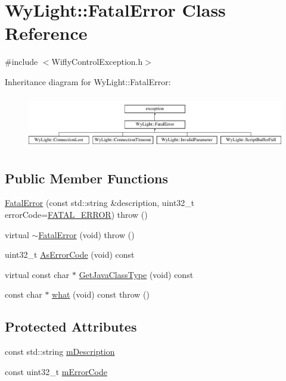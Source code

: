 \hypertarget{class_wy_light_1_1_fatal_error}{\section{Wy\-Light\-:\-:Fatal\-Error Class Reference}
\label{class_wy_light_1_1_fatal_error}
}


{\ttfamily \#include $<$Wifly\-Control\-Exception.\-h$>$}

Inheritance diagram for Wy\-Light\-:\-:Fatal\-Error\-:\begin{figure}[H]
\begin{center}
\leavevmode
\includegraphics[height=2.359551cm]{class_wy_light_1_1_fatal_error}
\end{center}
\end{figure}
\subsection*{Public Member Functions}
\begin{DoxyCompactItemize}
\item 
\hyperlink{class_wy_light_1_1_fatal_error_ab9aa2dc0e064e47d56052e0e9084200f}{Fatal\-Error} (const std\-::string \&description, uint32\-\_\-t error\-Code=\hyperlink{namespace_wy_light_afd625f917b07e9c48f67c4383af5773fab15784bfc61f7544f4b3bbac1817a793}{F\-A\-T\-A\-L\-\_\-\-E\-R\-R\-O\-R})  throw ()
\item 
virtual \hyperlink{class_wy_light_1_1_fatal_error_ae76658416075b597f03bee95f21f7a96}{$\sim$\-Fatal\-Error} (void)  throw ()
\item 
uint32\-\_\-t \hyperlink{class_wy_light_1_1_fatal_error_a15ae0113906c71cf34d631767371042c}{As\-Error\-Code} (void) const 
\item 
virtual const char $\ast$ \hyperlink{class_wy_light_1_1_fatal_error_aa74decc09fe8aafc15bfbe31f697987a}{Get\-Java\-Class\-Type} (void) const 
\item 
const char $\ast$ \hyperlink{class_wy_light_1_1_fatal_error_a971784e107b804fa177788061594a47d}{what} (void) const   throw ()
\end{DoxyCompactItemize}
\subsection*{Protected Attributes}
\begin{DoxyCompactItemize}
\item 
const std\-::string \hyperlink{class_wy_light_1_1_fatal_error_aeae1bd38ee1c9b21b260a10ecc89b5f4}{m\-Description}
\item 
const uint32\-\_\-t \hyperlink{class_wy_light_1_1_fatal_error_a7d6df57841d017b51107a80ac6205c93}{m\-Error\-Code}
\end{DoxyCompactItemize}
